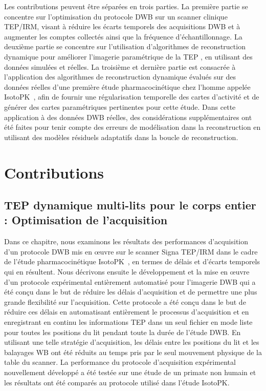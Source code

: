 \documentclass[a4paper]{article}
\begin{document}
Les contributions peuvent être séparées en trois parties. La première partie se concentre sur l'optimisation du protocole DWB sur un scanner clinique TEP/IRM, visant à réduire les écarts temporels des acquisitions DWB et à augmenter les comptes collectés ainsi que la fréquence d'échantillonnage. 
La deuxième partie se concentre sur l'utilisation d'algorithmes de reconstruction dynamique pour améliorer l'imagerie paramétrique de la TEP , en utilisant des données simulées et réelles.
La troisième et dernière partie est consacrée à l'application des algorithmes de reconstruction dynamique évalués sur des données réelles d'une première étude pharmacocinétique chez l'homme appelée IsotoPK~\cite{Marie2019}, afin de fournir une régularisation temporelle des cartes d'activité et de générer des cartes paramétriques pertinentes pour cette étude.
Dans cette application à des données DWB réelles, des considérations supplémentaires ont été faites pour tenir compte des erreurs de modélisation dans la reconstruction en utilisant des modèles résiduels adaptatifs dans la boucle de reconstruction.

\section*{Contributions}
\subsection*{TEP dynamique multi-lits pour le corps entier : Optimisation de l'acquisition}
Dans ce chapitre, nous examinons les résultats des performances d'acquisition d'un protocole DWB mis en œuvre sur le scanner Signa TEP/IRM dans le cadre de l'étude pharmacocinétique IsotoPK~\cite{Marie2019}, en termes de délais et d'écarts temporels qui en résultent.
Nous décrivons ensuite le développement et la mise en œuvre d'un protocole expérimental entièrement automatisé pour l'imagerie DWB qui a été conçu dans le but de réduire les délais d'acquisition et de permettre une plus grande flexibilité sur l'acquisition. Cette protocole a été conçu dans le but de réduire ces délais en automatisant entièrement le processus d'acquisition et en enregistrant en continu les informations TEP dans un seul fichier en mode liste pour toutes les positions du lit pendant toute la durée de l'étude DWB.
En utilisant une telle stratégie d'acquisition, les délais entre les positions du lit et les balayages WB ont été réduits au temps pris par le seul mouvement physique de la table du scanner. 
La performance du protocole d'acquisition expérimental nouvellement développé a été testée sur une étude de un primate non humain et les résultats ont été comparés au protocole utilisé dans l'étude IsotoPK.
\end{document}
